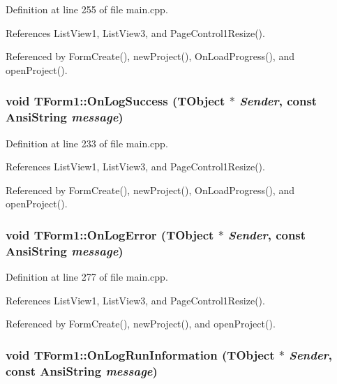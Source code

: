 Definition at line 255 of file main.cpp.

References ListView1, ListView3, and PageControl1Resize().

Referenced by FormCreate(), newProject(), OnLoadProgress(), and openProject().\hypertarget{classTForm1_067a9fd8ad4f3b2a59c34f8e317cbbc7}{
\subsubsection[OnLogSuccess]{\setlength{\rightskip}{0pt plus 5cm}void TForm1::OnLogSuccess (TObject $\ast$ {\em Sender}, \/  const AnsiString {\em message})}}
\label{classTForm1_067a9fd8ad4f3b2a59c34f8e317cbbc7}




Definition at line 233 of file main.cpp.

References ListView1, ListView3, and PageControl1Resize().

Referenced by FormCreate(), newProject(), OnLoadProgress(), and openProject().\hypertarget{classTForm1_080ddd93d3196c33b74c50c15b3720eb}{
\subsubsection[OnLogError]{\setlength{\rightskip}{0pt plus 5cm}void TForm1::OnLogError (TObject $\ast$ {\em Sender}, \/  const AnsiString {\em message})}}
\label{classTForm1_080ddd93d3196c33b74c50c15b3720eb}




Definition at line 277 of file main.cpp.

References ListView1, ListView3, and PageControl1Resize().

Referenced by FormCreate(), newProject(), and openProject().\hypertarget{classTForm1_cf5d1f0fac58364f539deb0bd46c4c49}{
\subsubsection[OnLogRunInformation]{\setlength{\rightskip}{0pt plus 5cm}void TForm1::OnLogRunInformation (TObject $\ast$ {\em Sender}, \/  const AnsiString {\em message})}}
\label{classTForm1_cf5d1f0fac58364f539deb0bd46c4c49}




